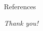 \begin{frame}[t]{References \hspace{3.25cm} }

  \begin{multicols}{2}
    \printbibliography
  \end{multicols}
  \vspace{0.25cm}
  \begin{center}
    \LARGE
    \textit{Thank you!}
  \end{center}

  \pnote {

  }
  
\end{frame}
